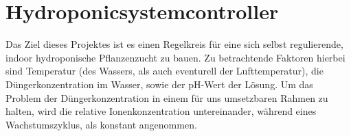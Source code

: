 \section{Hydroponicsystemcontroller}

Das Ziel dieses Projektes ist es einen Regelkreis für eine sich selbst regulierende, indoor hydroponische Pflanzenzucht zu bauen. Zu betrachtende Faktoren hierbei sind Temperatur (des Wassers, als auch eventurell der Lufttemperatur), die Düngerkonzentration im Wasser, sowie der pH-Wert der Lösung. Um das Problem der Düngerkonzentration in einem für uns umsetzbaren Rahmen zu halten, wird die relative Ionenkonzentration untereinander, während eines Wachstumszyklus, als konstant angenommen.
 